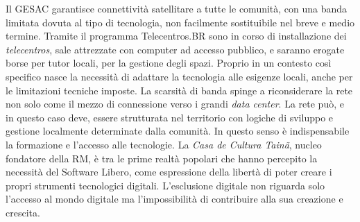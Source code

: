 Il GESAC garantisce connettività satellitare a tutte le comunità, con
una banda limitata dovuta al tipo di tecnologia, non facilmente
sostituibile nel breve e medio termine. Tramite il programma
Telecentros.BR sono in corso di installazione dei \emph{telecentros},
sale attrezzate con computer ad accesso pubblico, e saranno erogate
borse per tutor locali, per la gestione degli spazi. Proprio in un
contesto così specifico nasce la necessità di adattare la tecnologia
alle esigenze locali, anche per le limitazioni tecniche imposte. La
scarsità di banda spinge a riconsiderare la rete non solo come il
mezzo di connessione verso i grandi \emph{data center}. La rete può, e
in questo caso deve, essere strutturata nel territorio con logiche di
sviluppo e gestione localmente determinate dalla comunità. In questo
senso è indispensabile la formazione e l'accesso alle tecnologie. La
\emph{Casa de Cultura Tainã}, nucleo fondatore della RM, è tra le
prime realtà popolari che hanno percepito la necessità del Software
Libero, come espressione della libertà di poter creare i propri
strumenti tecnologici digitali. L'esclusione digitale non riguarda
solo l'accesso al mondo digitale ma l'impossibilità di contribuire
alla sua creazione e crescita.



